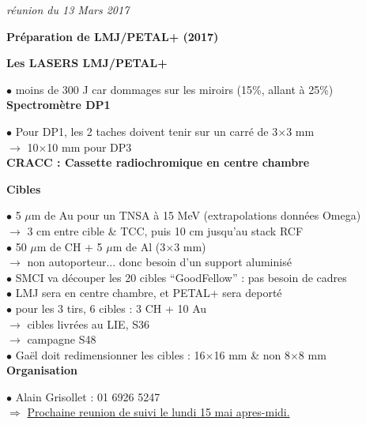 \documentclass{report}
\begin{document}
{\it
\noindent
r\'eunion du 13 Mars 2017}

\bigskip

\begin{center}
{\large
\bf
Pr\'eparation de LMJ/PETAL+ (2017)\\[0.2cm]
}
{\it }
\end{center}

\bigskip

\noindent
{\bf Les LASERS LMJ/PETAL+}

\noindent $\bullet$ moins de 300 J car dommages sur les miroirs (15\%, allant \`a 25\%) \\


\noindent
{\bf Spectromètre DP1}

\noindent $\bullet$ Pour DP1, les 2 taches doivent tenir sur un carr\'e de 3$\times$3 mm\\
\noindent $\rightarrow$ 10$\times$10 mm pour DP3\\


\noindent
{\bf CRACC : Cassette radiochromique en centre chambre}


\noindent
{\bf Cibles}

\noindent $\bullet$ 5 $\mu$m de Au pour un TNSA \`a 15 MeV (extrapolations donn\'ees Omega)\\
\noindent $\rightarrow$ 3 cm entre cible \& TCC, puis 10 cm jusqu'au stack RCF\\
\noindent $\bullet$ 50 $\mu$m de CH + 5 $\mu$m de Al (3$\times$3 mm)\\
\noindent $\rightarrow$ non autoporteur... donc besoin d'un support aluminis\'e\\
\noindent $\bullet$ SMCI va d\'ecouper les 20 cibles ``GoodFellow'' : pas besoin de cadres\\
\noindent $\bullet$ LMJ sera en centre chambre, et PETAL+ sera deport\'e\\
\noindent $\bullet$ pour les 3 tirs, 6 cibles : 3 CH + 10 Au\\
\noindent $\rightarrow$ cibles livr\'ees au LIE, S36\\
\noindent $\rightarrow$ campagne S48\\
\noindent $\bullet$ Ga\"el doit redimensionner les cibles : 16$\times$16 mm \& non 8$\times$8 mm\\


\noindent
{\bf Organisation}

\noindent $\bullet$ Alain Grisollet : 01 6926 5247\\


\noindent $\Rightarrow$ \underline{Prochaine reunion de suivi le lundi 15 mai apres-midi.}\\
\end{document}
